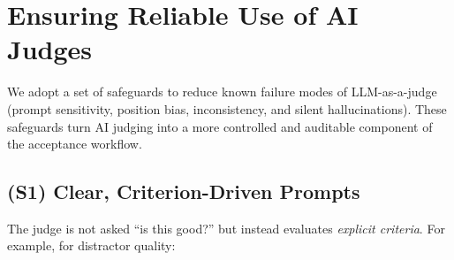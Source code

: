 \documentclass[11pt]{article}
\begin{document}
\section{Ensuring Reliable Use of AI Judges}
We adopt a set of safeguards to reduce known failure modes of LLM-as-a-judge (prompt sensitivity, position bias, inconsistency, and silent hallucinations). These safeguards turn AI judging into a more controlled and auditable component of the acceptance workflow.

\subsection{(S1) Clear, Criterion-Driven Prompts}
The judge is not asked ``is this good?'' but instead evaluates \emph{explicit criteria}. For example, for distractor quality:
\end{document}
